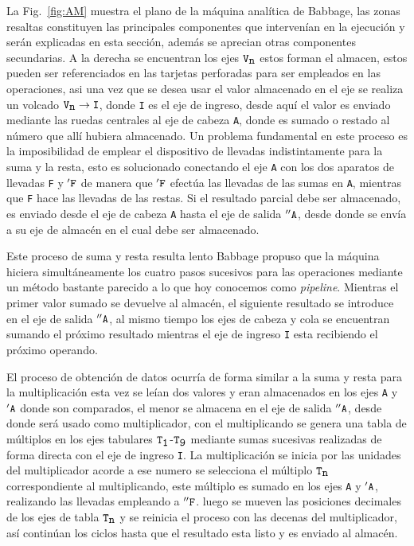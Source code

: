 \documentclass[runningheads,a4paper]{llncs}
\begin{document}
La Fig.~\ref{fig:AM} muestra el plano de la máquina analítica de Babbage, las zonas resaltas constituyen las principales componentes que intervenían en la ejecución y serán explicadas en esta sección, además se aprecian otras componentes secundarias. A la derecha se encuentran los ejes $\verb*|V|_{\verb*|n|}$ estos forman el almacen, estos pueden ser referenciados en las tarjetas perforadas para ser empleados en las operaciones, asi una vez que se desea usar el valor almacenado en el eje se realiza un volcado $\verb*|V|_{\verb*|n|} \rightarrow  \verb*|I|$, donde \verb*|I| es el eje de ingreso, desde aquí el valor es enviado mediante las ruedas centrales al eje de cabeza \verb*|A|, donde es sumado o restado al número que allí hubiera almacenado. Un problema fundamental en este proceso es la imposibilidad de emplear el dispositivo de llevadas indistintamente para la suma y la resta, esto es solucionado conectando el eje \verb*|A| con los dos aparatos de llevadas \verb*|F| y $'\verb*|F|$ de manera que $'\verb*|F|$ efectúa las llevadas de las sumas en \verb*|A|, mientras que \verb*|F| hace las llevadas de las restas. Si el resultado parcial debe ser almacenado, es enviado desde el eje de cabeza \verb*|A| hasta el eje de salida $''\verb*|A|$, desde donde se envía a su eje de almacén en el cual debe ser almacenado. 

Este proceso de suma y resta resulta lento Babbage propuso que la máquina hiciera simultáneamente los cuatro pasos sucesivos para las operaciones mediante un método bastante parecido a lo que hoy conocemos como \emph{pipeline}. Mientras el primer valor sumado se devuelve al almacén, el siguiente resultado se introduce en el eje de salida $''\verb*|A|$, al mismo tiempo los ejes de cabeza y cola se encuentran sumando el próximo resultado mientras el eje de ingreso \verb*|I| esta recibiendo el próximo operando.

El proceso de obtención de datos ocurría de forma similar a la suma y resta para la multiplicación esta vez se leían dos
valores y eran almacenados en los ejes \verb*|A| y $'\verb*|A|$ donde son comparados, el menor se almacena en el eje de 
salida $''\verb*|A|$, desde donde será usado como multiplicador, con el multiplicando se genera una tabla de múltiplos 
en los ejes tabulares $\verb*|T|_{\verb*|1|}$-$\verb*|T|_{\verb*|9|}$ mediante sumas sucesivas realizadas de forma directa con el eje de ingreso 
\verb*|I|. La multiplicación se inicia por las unidades del multiplicador acorde a ese numero se selecciona el múltiplo $\verb*|T|_{\verb*|n|}$ correspondiente al multiplicando, este múltiplo es sumado en los ejes \verb*|A| y $'\verb*|A|$, realizando las llevadas empleando a $''\verb*|F|$. luego se mueven las posiciones decimales de los ejes de tabla $\verb*|T|_{\verb*|n|}$ y se reinicia el proceso con las decenas del multiplicador, así continúan los ciclos hasta que el resultado esta listo y es enviado al 
almacén.
\newpage
\end{document}
